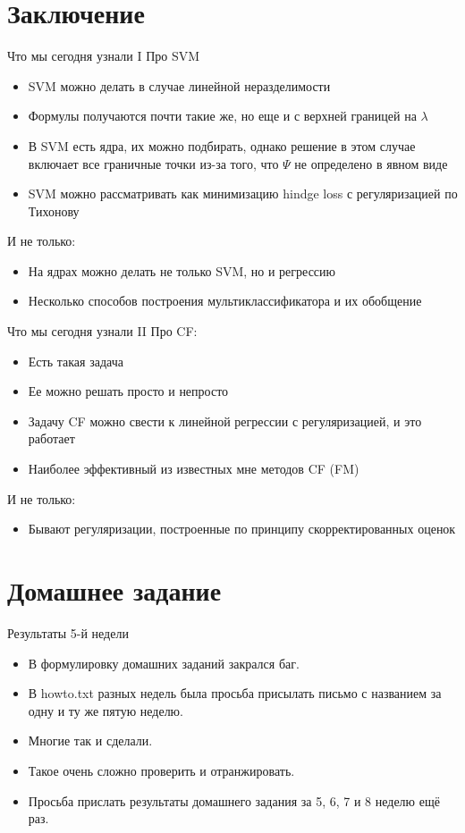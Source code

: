 \documentclass[14pt, fleqn, xcolor={dvipsnames, table}]{beamer}
\begin{document}
\section{Заключение}

\begin{frame}{Что мы сегодня узнали I}
\small
Про SVM
\begin{itemize}
  \item SVM можно делать в случае линейной неразделимости
  \item Формулы получаются почти такие же, но еще и с верхней границей на $\lambda$
  \item В SVM есть ядра, их можно подбирать, однако решение в этом случае включает все граничные точки из-за того, что $\Psi$ не определено в явном виде
  \item SVM можно рассматривать как минимизацию hindge loss с регуляризацией по Тихонову
\end{itemize}
И не только:
\begin{itemize}
  \item На ядрах можно делать не только SVM, но и регрессию
  \item Несколько способов построения мультиклассификатора и их обобщение
\end{itemize}
\end{frame}

\begin{frame}{Что мы сегодня узнали II}
\small
Про CF:
\begin{itemize}
  \item Есть такая задача
  \item Ее можно решать просто и непросто
  \item Задачу CF можно свести к линейной регрессии с регуляризацией, и это работает
  \item Наиболее эффективный из известных мне методов CF (FM)
\end{itemize}
И не только:
\begin{itemize}
  \item Бывают регуляризации, построенные по принципу скорректированных оценок
\end{itemize}
\end{frame}

\section{Домашнее задание}
\begin{frame}{Результаты 5-й недели}
\begin{itemize}
  \item В формулировку домашних заданий закрался баг.
  \item В howto.txt разных недель была просьба присылать письмо с названием за одну и ту же пятую неделю.
  \item Многие так и сделали.
  \item Такое очень сложно проверить и отранжировать.
  \item Просьба прислать результаты домашнего задания за 5, 6, 7 и 8 неделю ещё раз. 
\end{itemize}
\end{frame}
\end{document}
